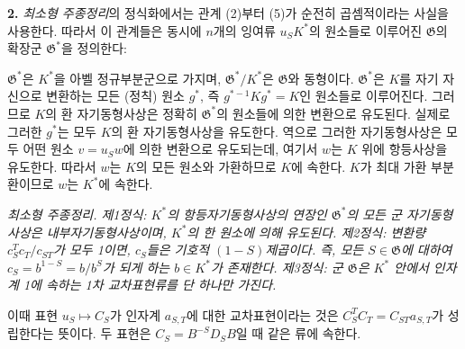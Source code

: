
\noindent\textbf{2.} \emph{최소형 주종정리}의 정식화에서는 관계 (2)부터 (5)가 순전히 곱셈적이라는 사실을 사용한다. 따라서 이 관계들은 동시에 \(n\)개의 잉여류 \(u_SK^*\)의 원소들로 이루어진 \(\mathfrak G\)의 확장군 \(\mathfrak G^*\)을 정의한다:


\(\mathfrak G^*\)은 \(K^*\)을 아벨 정규부분군으로 가지며, \(\mathfrak G^*/K^*\)은 \(\mathfrak G\)와 동형이다. \(\mathfrak G^*\)은 \(K\)를 자기 자신으로 변환하는 모든 (정칙) 원소 \(g^*\), 즉 \(g^{*-1}Kg^*=K\)인 원소들로 이루어진다. 그러므로 \(K\)의 환 자기동형사상은 정확히 \(\mathfrak G^*\)의 원소들에 의한 변환으로 유도된다. 실제로 그러한 \(g^*\)는 모두 \(K\)의 환 자기동형사상을 유도한다. 역으로 그러한 자기동형사상은 모두 어떤 원소 \(v=u_Sw\)에 의한 변환으로 유도되는데, 여기서 \(w\)는 \(K\) 위에 항등사상을 유도한다. 따라서 \(w\)는 \(K\)의 모든 원소와 가환하므로 \(K\)에 속한다. \(K\)가 최대 가환 부분환이므로 \(w\)는 \(K^*\)에 속한다.

\emph{최소형 주종정리. 제1정식: \(K^*\)의 항등자기동형사상의 연장인 \(\mathfrak G^*\)의 모든 군 자기동형사상은 내부자기동형사상이며, \(K^*\)의 한 원소에 의해 유도된다. 제2정식: 변환량 \(c_S^Tc_T/c_{ST}\)가 모두 1이면, \(c_S\)들은 기호적 \((1-S)\)제곱이다. 즉, 모든 \(S\in\mathfrak G\)에 대하여 \(c_S=b^{1-S}=b/b^S\)가 되게 하는 \(b\in K^*\)가 존재한다. 제3정식: 군 \(\mathfrak G\)은 \(K^*\) 안에서 인자계 1에 속하는 1차 교차표현류를 단 하나만 가진다.}

이때 표현 \(u_S\mapsto C_S\)가 인자계 \(a_{S,T}\)에 대한 교차표현이라는 것은 \(C_S^TC_T=C_{ST}a_{S,T}\)가 성립한다는 뜻이다. 두 표현은 \(C_S=B^{-S}D_SB\)일 때 같은 류에 속한다.
